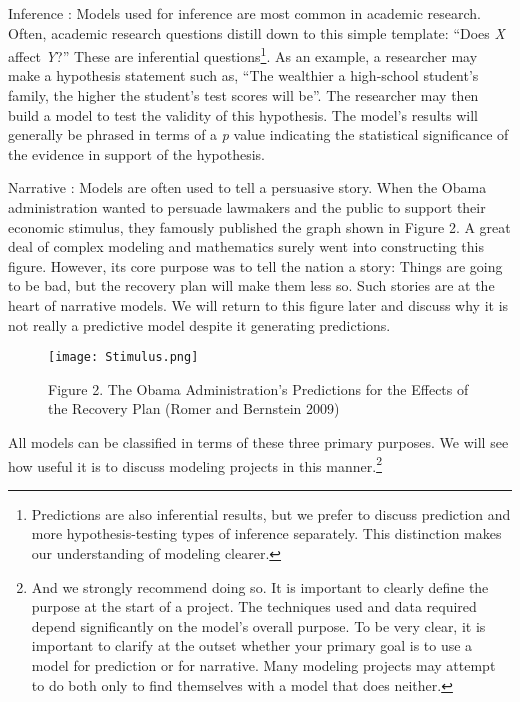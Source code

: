 \documentclass[]{memoir}
\let\Oldincludegraphics\includegraphics
\renewcommand{\includegraphics}[1]{\Oldincludegraphics[max size={\textwidth}{\textheight}]{#1}}
\begin{document}
Inference : Models used for inference are most common in academic
research. Often, academic research questions distill down to this simple
template: ``Does \emph{X} affect \emph{Y}?'' These are inferential
questions\footnote{Predictions are also inferential results, but we
  prefer to discuss prediction and more hypothesis-testing types of
  inference separately. This distinction makes our understanding of
  modeling clearer.}. As an example, a researcher may make a hypothesis
statement such as, ``The wealthier a high-school student's family, the
higher the student's test scores will be''. The researcher may then
build a model to test the validity of this hypothesis. The model's
results will generally be phrased in terms of a \emph{p} value
indicating the statistical significance of the evidence in support of
the hypothesis.

Narrative : Models are often used to tell a persuasive story. When the
Obama administration wanted to persuade lawmakers and the public to
support their economic stimulus, they famously published the graph shown
in Figure 2. A great deal of complex modeling and mathematics surely
went into constructing this figure. However, its core purpose was to
tell the nation a story: Things are going to be bad, but the recovery
plan will make them less so. Such stories are at the heart of narrative
models. We will return to this figure later and discuss why it is not
really a predictive model despite it generating predictions.

\begin{figure}[htbp]
\centering
\texttt{[image: Stimulus.png]}
\caption{Figure 2. The Obama Administration's Predictions for the
Effects of the Recovery Plan (Romer and Bernstein 2009)}
\end{figure}

All models can be classified in terms of these three primary purposes.
We will see how useful it is to discuss modeling projects in this
manner.\footnote{And we strongly recommend doing so. It is important to
  clearly define the purpose at the start of a project. The techniques
  used and data required depend significantly on the model's overall
  purpose. To be very clear, it is important to clarify at the outset
  whether your primary goal is to use a model for prediction or for
  narrative. Many modeling projects may attempt to do both only to find
  themselves with a model that does neither.}

\end{document}
